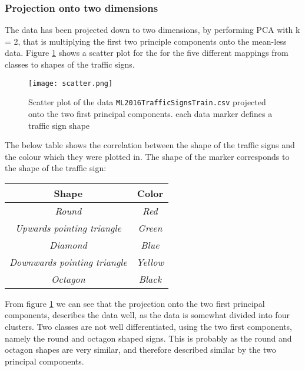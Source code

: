 \documentclass{article}
\begin{document}
\subsubsection{Projection onto two dimensions}
The data has been projected down to two dimensions, by performing PCA with k = 2, that is multiplying the first two principle components onto the mean-less data. Figure \ref{fig:scatter} shows a scatter plot for the for the five different mappings from classes to shapes of the traffic signs.
\begin{figure}[H]
  \centering
  \texttt{[image: scatter.png]}
  \caption{Scatter plot of the data \texttt{ML2016TrafficSignsTrain.csv} projected onto the two first principal components. each data marker defines a traffic sign shape}
  \label{fig:scatter}
\end{figure}
The below table shows the correlation between the shape of the traffic signs and the colour which they were plotted in. The shape of the marker corresponds to the shape of the traffic sign:
\begin{table}[H]
  \centering
  \begin{tabular}{c||c}
    \textsf{Shape} & \textsf{Color}\\
    \hline
    \textsl{Round} & \textsl{Red} \\
    \textsl{Upwards pointing triangle} & \textsl{Green} \\
    \textsl{Diamond} & \textsl{Blue} \\
    \textsl{Downwards pointing triangle} & \textsl{Yellow} \\
    \textsl{Octagon} & \textsl{Black} \\
  \end{tabular}
\end{table}
From figure \ref{fig:scatter} we can see that the projection onto the two first principal components, describes the data well, as the data is somewhat divided into four clusters. Two classes are not well differentiated, using the two first components, namely the round and octagon shaped signs. This is probably as the round and octagon shapes are very similar, and therefore described similar by the two principal components.
\end{document}
